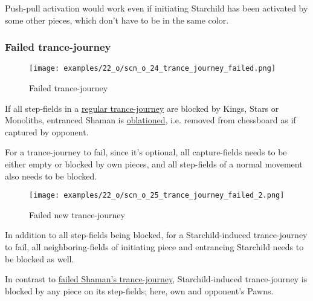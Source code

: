 Push-pull activation would work even if initiating Starchild has been activated by some other pieces,
which don't have to be in the same color.

\clearpage %

\subsubsection*{Failed trance-journey}

\vspace*{-1.1\baselineskip}
\noindent
\begin{figure}[!h]
\texttt{[image: examples/22\_o/scn\_o\_24\_trance\_journey\_failed.png]}
\caption{Failed trance-journey}
\label{fig:scn_o_24_trance_journey_failed}
\end{figure}

If all step-fields in a \hyperref[fig:scn_cot_09_trance_journey_init]{regular trance-journey} are
blocked by Kings, Stars or Monoliths, entranced Shaman is \hyperref[sec:Terms/Oblation]{oblationed},
i.e. removed from chessboard as if captured by opponent.

For a trance-journey to fail, since it's optional, all capture-fields needs to be either empty or
blocked by own pieces, and all step-fields of a normal movement also needs to be blocked.

\clearpage %

\noindent
\begin{figure}[!h]
\texttt{[image: examples/22\_o/scn\_o\_25\_trance\_journey\_failed\_2.png]}
\caption{Failed new trance-journey}
\label{fig:scn_o_25_trance_journey_failed_2}
\end{figure}

In addition to all step-fields being blocked, for a Starchild-induced trance-journey to fail, all
neighboring-fields of initiating piece and entrancing Starchild needs to be blocked as well.

In contrast to \hyperref[fig:scn_o_24_trance_journey_failed]{failed Shaman's trance-journey},
Starchild-induced trance-journey is blocked by any piece on its step-fields; here, own and
opponent's Pawns.

